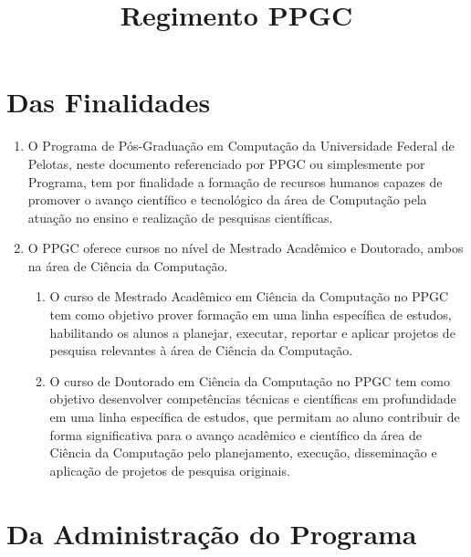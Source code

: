\documentclass{article}
\title{Regimento PPGC}
\begin{document}
\maketitle

\section{Das Finalidades}

\begin{enumerate}
\item O Programa de Pós-Graduação em Computação da Universidade Federal de Pelotas, neste documento referenciado por PPGC ou simplesmente por Programa, tem por finalidade a formação de recursos humanos capazes de promover o avanço científico e tecnológico da área de Computação pela atuação no ensino e realização de pesquisas científicas.

\item O PPGC oferece cursos no nível de Mestrado Acadêmico e Doutorado, ambos na área de Ciência da Computação.
\begin{enumerate}
	\item O curso de Mestrado Acadêmico em Ciência da Computação no PPGC tem como objetivo prover formação em uma linha específica de estudos, habilitando os alunos a planejar, executar, reportar e aplicar projetos de pesquisa relevantes à área de Ciência da Computação.

	\item O curso de Doutorado em Ciência da Computação no PPGC tem como objetivo desenvolver competências técnicas e científicas em profundidade em uma linha específica de estudos, que permitam ao aluno contribuir de forma significativa para o avanço acadêmico e científico da área de Ciência da Computação pelo planejamento, execução, disseminação e aplicação de projetos de pesquisa originais.

\end{enumerate}

\end{enumerate}

\section{Da Administração do Programa}
\end{document}
